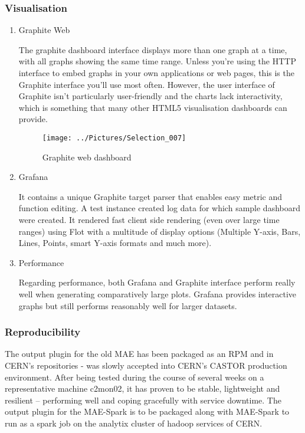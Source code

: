 \documentclass[11pt, letterpaper]{article}            %
\begin{document}
\subsubsection{Visualisation}
\begin{enumerate}
	\item Graphite Web
	
	The graphite dashboard interface displays more than one graph at a time, with all graphs showing the same time range. Unless you’re using the HTTP interface to embed graphs in your own applications or web pages, this is the Graphite interface you’ll use most often. However, the user interface of Graphite isn't particularly user-friendly and the charts lack interactivity, which is something that many other HTML5 visualisation dashboards can provide. \citep{graphitedocs}
	
	\begin{figure}[h]
		\centering 
		\texttt{[image: ../Pictures/Selection\_007]}
				\caption{Graphite web dashboard}
	\end{figure}
	
	\item Grafana
	
	It contains a unique Graphite target parser that enables easy metric and function editing. A test instance created log data for which sample dashboard were created.  It rendered fast client side rendering (even over large time ranges) using Flot with a multitude of display options (Multiple Y-axis, Bars, Lines, Points, smart Y-axis formats and much more). \citep{grafana}
	
	\item Performance
	
	Regarding performance, both Grafana and Graphite interface perform really well when generating comparatively large plots. 
	Grafana provides interactive graphs but still performs reasonably well for larger datasets. 
\end{enumerate}
\subsubsection{Reproducibility}
The output plugin for the old MAE has been packaged as an RPM and  in CERN's repositories - was slowly accepted into CERN's CASTOR production environment.  After being tested during the course of several weeks on a representative machine c2mon02, it has proven to be stable, lightweight and resilient – performing well and coping gracefully with service downtime. 
The output plugin for the MAE-Spark is to be packaged along with MAE-Spark to run as a spark job on the analytix cluster of hadoop services of CERN. 
\end{document}
